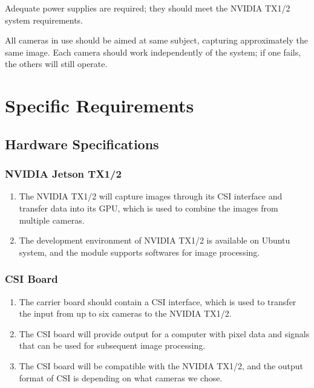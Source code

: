 \documentclass[letterpaper,10pt,serif,draftclsnofoot,onecolumn,compsoc,titlepage]{IEEEtran}
\begin{document}
Adequate power supplies are required; 
they should meet the NVIDIA TX1/2 system requirements. 

All cameras in use should be 
aimed at same subject, capturing approximately the same image. Each camera should 
work independently of the system; if one fails, the others will still operate.\\

\section{Specific Requirements}

\subsection{Hardware Specifications}

\subsubsection{NVIDIA Jetson TX1/2}

\begin{enumerate}[label=\alph*]
	\item The NVIDIA TX1/2 will capture images through its CSI interface and transfer data 
	into its GPU, which is used to combine the images from multiple cameras.\\ 
	\item The development environment of NVIDIA TX1/2 is available on Ubuntu system, and the 
	module supports softwares for image processing.\\
\end{enumerate}

\subsubsection{CSI Board}

\begin{enumerate}[label=\alph*]
	\item The carrier board should contain a CSI interface, which is used to transfer the
	input from up to six cameras to the NVIDIA TX1/2. \\
	\item The CSI board will provide output for a computer with pixel data and signals that 
	can be used for subsequent image processing.\\
	\item The CSI board will be compatible with the NVIDIA TX1/2, and the output format of 
	CSI is depending on what cameras we chose.\\
\end{enumerate}
\end{document}
